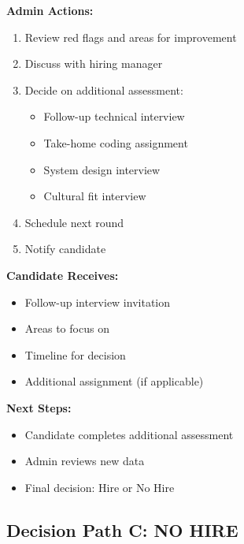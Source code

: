 \documentclass[12pt,a4paper]{article}
\begin{document}
\begin{tcolorbox}[colback=warningyellow!5,colframe=warningyellow,title=\textbf{Maybe Decision Process}]

\textbf{Admin Actions:}
\begin{enumerate}
    \item Review red flags and areas for improvement
    \item Discuss with hiring manager
    \item Decide on additional assessment:
    \begin{itemize}
        \item Follow-up technical interview
        \item Take-home coding assignment
        \item System design interview
        \item Cultural fit interview
    \end{itemize}
    \item Schedule next round
    \item Notify candidate
\end{enumerate}

\textbf{Candidate Receives:}
\begin{itemize}
    \item Follow-up interview invitation
    \item Areas to focus on
    \item Timeline for decision
    \item Additional assignment (if applicable)
\end{itemize}

\textbf{Next Steps:}
\begin{itemize}
    \item Candidate completes additional assessment
    \item Admin reviews new data
    \item Final decision: Hire or No Hire
\end{itemize}

\end{tcolorbox}

\vspace{0.5cm}

\subsection{Decision Path C: NO HIRE}
\end{document}
